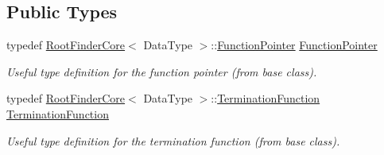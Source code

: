 \subsection*{Public Types}
\begin{DoxyCompactItemize}
\item 
typedef \hyperlink{classtudat_1_1root__finders_1_1RootFinderCore}{Root\+Finder\+Core}$<$ Data\+Type $>$\+::\hyperlink{classtudat_1_1root__finders_1_1BisectionCore_aaceafb2a0ce4effa2862eea28d7869c3}{Function\+Pointer} \hyperlink{classtudat_1_1root__finders_1_1BisectionCore_aaceafb2a0ce4effa2862eea28d7869c3}{Function\+Pointer}\hypertarget{classtudat_1_1root__finders_1_1BisectionCore_aaceafb2a0ce4effa2862eea28d7869c3}{}\label{classtudat_1_1root__finders_1_1BisectionCore_aaceafb2a0ce4effa2862eea28d7869c3}

\begin{DoxyCompactList}\small\item\em Useful type definition for the function pointer (from base class). \end{DoxyCompactList}\item 
typedef \hyperlink{classtudat_1_1root__finders_1_1RootFinderCore}{Root\+Finder\+Core}$<$ Data\+Type $>$\+::\hyperlink{classtudat_1_1root__finders_1_1BisectionCore_a4bfc03809c03253f1e3602cb75335adf}{Termination\+Function} \hyperlink{classtudat_1_1root__finders_1_1BisectionCore_a4bfc03809c03253f1e3602cb75335adf}{Termination\+Function}\hypertarget{classtudat_1_1root__finders_1_1BisectionCore_a4bfc03809c03253f1e3602cb75335adf}{}\label{classtudat_1_1root__finders_1_1BisectionCore_a4bfc03809c03253f1e3602cb75335adf}

\begin{DoxyCompactList}\small\item\em Useful type definition for the termination function (from base class). \end{DoxyCompactList}\end{DoxyCompactItemize}
